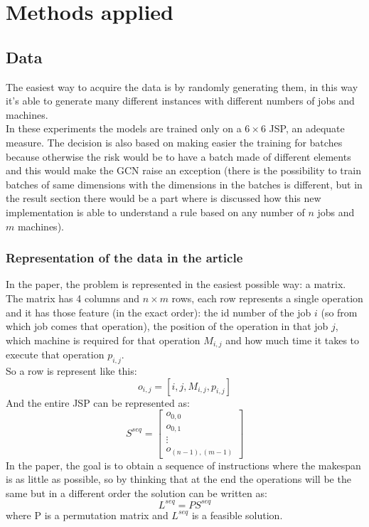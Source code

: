 \documentclass[12pt]{book}
\begin{document}
\chapter{Methods applied}
\section{Data}
The easiest way to acquire the data is by randomly generating them, in this way it's able to generate many different instances with different numbers of jobs and machines.\\
In these experiments the models are trained only on a $6\times6$ JSP, an adequate measure. The decision is also based on making easier the training for batches because otherwise the risk would be to have a batch made of different elements and this would make the GCN raise an exception (there is the possibility to train batches of same dimensions with the dimensions in the batches is different, but in the result section there would be a part where is discussed how this new implementation is able to understand a rule based on any number of $n$ jobs and $m$ machines).
\subsection{Representation of the data in the article}
In the paper, the problem is represented in the easiest possible way: a matrix. The matrix has 4 columns and $n\times m$ rows, each row represents a single operation and it has those feature (in the exact order): the id number of the job $i$ (so from which job comes that operation), the position of the operation in that job $j$, which machine is required for that operation $M_{i,j}$ and how much time it takes to execute that operation $p_{i,j}$.\\
So a row is represent like this:
\[o_{i,j} = [i, j, M_{i,j}, p_{i,j}]\]
And the entire JSP can be represented as: 
\[
    S^{seq} = \begin{bmatrix}
           o_{0,0} \\
           o_{0,1} \\
           \vdots \\
           o_{(n-1),(m-1)}
         \end{bmatrix}
\]
In the paper, the goal is to obtain a sequence of instructions where the makespan is as little as possible, so by thinking that at the end the operations will be the same but in a different order the solution can be written as: 
\[L^{seq}=PS^{seq}\]
where P is a permutation matrix and $L^{seq}$ is a feasible solution.
\end{document}
